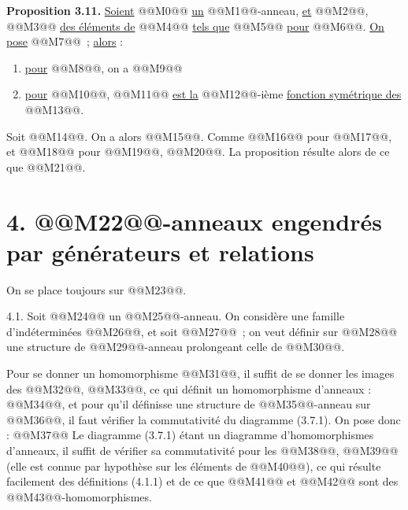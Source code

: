 
\textbf{Proposition 3.11.} \uline{Soient} @@M0@@ \uline{un} @@M1@@-anneau, \uline{et} @@M2@@, @@M3@@ \uline{des éléments de} @@M4@@ \uline{tels que} @@M5@@ \uline{pour} @@M6@@. \uline{On pose} @@M7@@~; \uline{alors} :
\begin{enumerate}[label=\roman*)]
\item \uline{pour} @@M8@@, on a @@M9@@
\item \uline{pour} @@M10@@, @@M11@@ \uline{est la} @@M12@@-ième \uline{fonction symétrique des} @@M13@@.
\end{enumerate}
Soit @@M14@@. On a alors @@M15@@. Comme @@M16@@ pour @@M17@@, et @@M18@@ pour @@M19@@, @@M20@@. La proposition résulte alors de ce que @@M21@@.

\section*{4. @@M22@@-anneaux engendrés par générateurs et relations}

On se place toujours sur @@M23@@.

4.1. Soit @@M24@@ un @@M25@@-anneau. On considère une famille d'indéterminées @@M26@@, et soit @@M27@@~; on veut définir sur @@M28@@ une structure de @@M29@@-anneau prolongeant celle de @@M30@@.

Pour se donner un homomorphisme @@M31@@, il suffit de se donner les images des @@M32@@, @@M33@@, ce qui définit un homomorphisme d'anneaux : @@M34@@, et pour qu'il définisse une structure de @@M35@@-anneau sur @@M36@@, il faut vérifier la commutativité du diagramme (3.7.1). On pose donc :
@@M37@@
Le diagramme (3.7.1) étant un diagramme d'homomorphismes d'anneaux, il suffit de vérifier sa commutativité pour les @@M38@@, @@M39@@ (elle est connue par hypothèse sur les éléments de @@M40@@), ce qui résulte facilement des définitions (4.1.1) et de ce que @@M41@@ et @@M42@@ sont des @@M43@@-homomorphismes.

